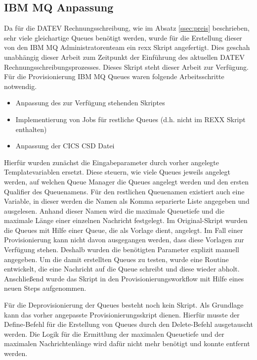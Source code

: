 \subsection{IBM MQ Anpassung}\label{ssec:mqentw}
Da für die DATEV Rechnungsschreibung, wie im Absatz \ref{ssec:preis} beschrieben, sehr viele gleichartige Queues benötigt werden, wurde für die Erstellung dieser von den IBM MQ Administratorenteam ein \Gls{rexx} Skript angefertigt.
Dies geschah unabhängig dieser Arbeit zum Zeitpunkt der Einführung des aktuellen DATEV Rechnungsschreibungsprozesses.
Dieses Skript steht dieser Arbeit zur Verfügung.
Für die Provisionierung IBM MQ Queues waren folgende Arbeitsschritte notwendig.

\begin{samepage}
\begin{itemize}
\item Anpassung des zur Verfügung stehenden Skriptes
\item Implementierung von Jobs für restliche Queues (d.h. nicht im REXX Skript enthalten)
\item Anpassung der CICS CSD Datei
\end{itemize}
\end{samepage}

Hierfür wurden zunächst die Eingabeparameter durch vorher angelegte Templatevariablen ersetzt.
Diese steuern, wie viele Queues jeweils angelegt werden, auf welchen Queue Manager die Queues angelegt werden und den ersten Qualifier des Queuenamens.
Für den restlichen Queuenamen existiert auch eine Variable, in dieser werden die Namen als Komma separierte Liste angegeben und ausgelesen.
Anhand dieser Namen wird  die maximale Queuetiefe und die maximale Länge einer einzelnen Nachricht festgelegt.
Im Original-Skript wurden die Queues mit Hilfe einer Queue, die als Vorlage dient, angelegt.
Im Fall einer Provisionierung kann nicht davon ausgegangen werden, dass diese Vorlagen zur Verfügung stehen.
Deshalb wurden die benötigten Parameter explizit manuell angegeben.
Um die damit erstellten Queues zu testen, wurde eine Routine entwickelt, die eine Nachricht auf die Queue schreibt und diese wieder abholt.
Anschließend wurde das Skript in den Provisionierungsworkflow mit Hilfe eines neuen Steps aufgenommen.

Für die Deprovisionierung der Queues besteht noch kein Skript.
Als Grundlage kann das vorher angepasste Provisionierungsskript dienen.
Hierfür musste der \glqq Define\grqq-Befehl für die Erstellung von Queues durch den \glqq Delete\grqq-Befehl ausgetauscht werden.
Die Logik für die Ermittlung der maximalen Queuetiefe und der maximalen Nachrichtenlänge wird dafür nicht mehr benötigt und konnte entfernt werden.


